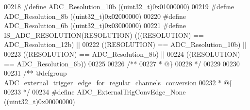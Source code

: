 \begin{DoxyCode}
00218 \textcolor{preprocessor}{#}\textcolor{preprocessor}{define} \textcolor{preprocessor}{ADC\_Resolution\_10b}                         \textcolor{preprocessor}{(}\textcolor{preprocessor}{(}\textcolor{preprocessor}{uint32\_t}\textcolor{preprocessor}{)}0x01000000\textcolor{preprocessor}{)}
00219 \textcolor{preprocessor}{#}\textcolor{preprocessor}{define} \textcolor{preprocessor}{ADC\_Resolution\_8b}                          \textcolor{preprocessor}{(}\textcolor{preprocessor}{(}\textcolor{preprocessor}{uint32\_t}\textcolor{preprocessor}{)}0x02000000\textcolor{preprocessor}{)}
00220 \textcolor{preprocessor}{#}\textcolor{preprocessor}{define} \textcolor{preprocessor}{ADC\_Resolution\_6b}                          \textcolor{preprocessor}{(}\textcolor{preprocessor}{(}\textcolor{preprocessor}{uint32\_t}\textcolor{preprocessor}{)}0x03000000\textcolor{preprocessor}{)}
00221 \textcolor{preprocessor}{#}\textcolor{preprocessor}{define} \textcolor{preprocessor}{IS\_ADC\_RESOLUTION}\textcolor{preprocessor}{(}\textcolor{preprocessor}{RESOLUTION}\textcolor{preprocessor}{)} \textcolor{preprocessor}{(}\textcolor{preprocessor}{(}\textcolor{preprocessor}{(}\textcolor{preprocessor}{RESOLUTION}\textcolor{preprocessor}{)} \textcolor{preprocessor}{==} ADC_Resolution_12b\textcolor{preprocessor}{)} \textcolor{preprocessor}{||}
00222                                        \textcolor{preprocessor}{(}\textcolor{preprocessor}{(}\textcolor{preprocessor}{RESOLUTION}\textcolor{preprocessor}{)} \textcolor{preprocessor}{==} ADC_Resolution_10b\textcolor{preprocessor}{)} \textcolor{preprocessor}{||}
00223                                        \textcolor{preprocessor}{(}\textcolor{preprocessor}{(}\textcolor{preprocessor}{RESOLUTION}\textcolor{preprocessor}{)} \textcolor{preprocessor}{==} ADC_Resolution_8b\textcolor{preprocessor}{)} \textcolor{preprocessor}{||}
00224                                        \textcolor{preprocessor}{(}\textcolor{preprocessor}{(}\textcolor{preprocessor}{RESOLUTION}\textcolor{preprocessor}{)} \textcolor{preprocessor}{==} ADC_Resolution_6b\textcolor{preprocessor}{)}\textcolor{preprocessor}{)}
00225 
00226 \textcolor{comment}{/**}
00227 \textcolor{comment}{  * @\}}
00228 \textcolor{comment}{  */}
00229 
00230 
00231 \textcolor{comment}{/** @defgroup ADC\_external\_trigger\_edge\_for\_regular\_channels\_conversion }
00232 \textcolor{comment}{  * @\{}
00233 \textcolor{comment}{  */}
00234 \textcolor{preprocessor}{#}\textcolor{preprocessor}{define} \textcolor{preprocessor}{ADC\_ExternalTrigConvEdge\_None}          \textcolor{preprocessor}{(}\textcolor{preprocessor}{(}\textcolor{preprocessor}{uint32\_t}\textcolor{preprocessor}{)}0x00000000\textcolor{preprocessor}{)}

\end{DoxyCode}
